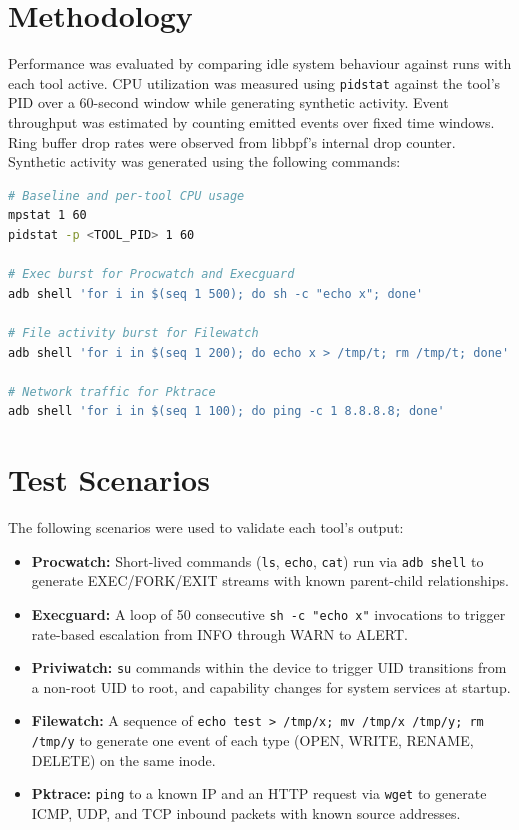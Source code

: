 \documentclass{mnitjaipur}
\begin{document}
\section{Methodology}
Performance was evaluated by comparing idle system behaviour against runs with each tool active. CPU utilization was measured using \texttt{pidstat} against the tool's PID over a 60-second window while generating synthetic activity. Event throughput was estimated by counting emitted events over fixed time windows. Ring buffer drop rates were observed from libbpf's internal drop counter. Synthetic activity was generated using the following commands:

\begin{lstlisting}[language=bash,caption={Performance measurement commands}]
# Baseline and per-tool CPU usage
mpstat 1 60
pidstat -p <TOOL_PID> 1 60

# Exec burst for Procwatch and Execguard
adb shell 'for i in $(seq 1 500); do sh -c "echo x"; done'

# File activity burst for Filewatch
adb shell 'for i in $(seq 1 200); do echo x > /tmp/t; rm /tmp/t; done'

# Network traffic for Pktrace
adb shell 'for i in $(seq 1 100); do ping -c 1 8.8.8.8; done'
\end{lstlisting}

\section{Test Scenarios}
The following scenarios were used to validate each tool's output:
\begin{itemize}
  \item \textbf{Procwatch:} Short-lived commands (\texttt{ls}, \texttt{echo}, \texttt{cat}) run via \texttt{adb shell} to generate EXEC/FORK/EXIT streams with known parent-child relationships.
  \item \textbf{Execguard:} A loop of 50 consecutive \texttt{sh -c "echo x"} invocations to trigger rate-based escalation from INFO through WARN to ALERT.
  \item \textbf{Priviwatch:} \texttt{su} commands within the device to trigger UID transitions from a non-root UID to root, and capability changes for system services at startup.
  \item \textbf{Filewatch:} A sequence of \texttt{echo test > /tmp/x; mv /tmp/x /tmp/y; rm /tmp/y} to generate one event of each type (OPEN, WRITE, RENAME, DELETE) on the same inode.
  \item \textbf{Pktrace:} \texttt{ping} to a known IP and an HTTP request via \texttt{wget} to generate ICMP, UDP, and TCP inbound packets with known source addresses.
\end{itemize}
\end{document}
